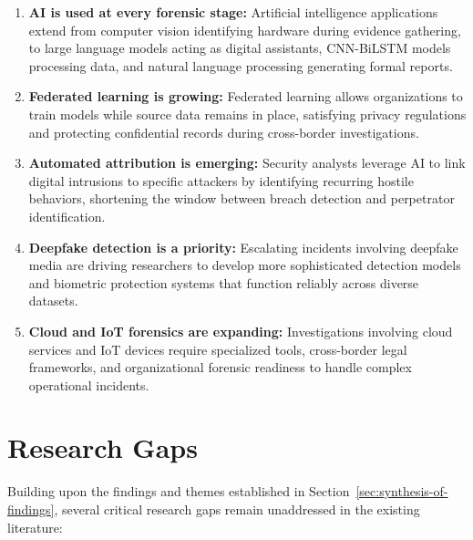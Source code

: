 \documentclass[12pt,a4paper]{article}
\begin{document}
\begin{enumerate}
    \item \textbf{AI is used at every forensic stage:} Artificial intelligence applications extend from computer vision identifying hardware during evidence gathering, to large language models acting as digital assistants, CNN-BiLSTM models processing data, and natural language processing generating formal reports.
    \item \textbf{Federated learning is growing:} Federated learning allows organizations to train models while source data remains in place, satisfying privacy regulations and protecting confidential records during cross-border investigations.
    \item \textbf{Automated attribution is emerging:} Security analysts leverage AI to link digital intrusions to specific attackers by identifying recurring hostile behaviors, shortening the window between breach detection and perpetrator identification.
    \item \textbf{Deepfake detection is a priority:} Escalating incidents involving deepfake media are driving researchers to develop more sophisticated detection models and biometric protection systems that function reliably across diverse datasets.
    \item \textbf{Cloud and IoT forensics are expanding:} Investigations involving cloud services and IoT devices require specialized tools, cross-border legal frameworks, and organizational forensic readiness to handle complex operational incidents.
\end{enumerate}

\newpage
\section{Research Gaps}
\label{sec:research-gaps}

Building upon the findings and themes established in Section~\ref{sec:synthesis-of-findings}, several critical research gaps remain unaddressed in the existing literature:
\end{document}
